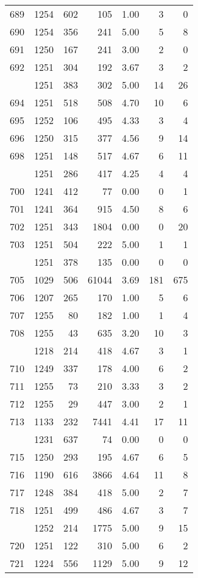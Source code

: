 \documentclass[
]{article}
\begin{document}
\begin{table}
\begin{tabular}[t]{lrrrrrr}
689 & 1254 & 602 & 105 & 1.00 & 3 & 0\\
690 & 1254 & 356 & 241 & 5.00 & 5 & 8\\
691 & 1250 & 167 & 241 & 3.00 & 2 & 0\\
692 & 1251 & 304 & 192 & 3.67 & 3 & 2\\
\addlinespace
693 & 1251 & 383 & 302 & 5.00 & 14 & 26\\
694 & 1251 & 518 & 508 & 4.70 & 10 & 6\\
695 & 1252 & 106 & 495 & 4.33 & 3 & 4\\
696 & 1250 & 315 & 377 & 4.56 & 9 & 14\\
698 & 1251 & 148 & 517 & 4.67 & 6 & 11\\
\addlinespace
699 & 1251 & 286 & 417 & 4.25 & 4 & 4\\
700 & 1241 & 412 & 77 & 0.00 & 0 & 1\\
701 & 1241 & 364 & 915 & 4.50 & 8 & 6\\
702 & 1251 & 343 & 1804 & 0.00 & 0 & 20\\
703 & 1251 & 504 & 222 & 5.00 & 1 & 1\\
\addlinespace
704 & 1251 & 378 & 135 & 0.00 & 0 & 0\\
705 & 1029 & 506 & 61044 & 3.69 & 181 & 675\\
706 & 1207 & 265 & 170 & 1.00 & 5 & 6\\
707 & 1255 & 80 & 182 & 1.00 & 1 & 4\\
708 & 1255 & 43 & 635 & 3.20 & 10 & 3\\
\addlinespace
709 & 1218 & 214 & 418 & 4.67 & 3 & 1\\
710 & 1249 & 337 & 178 & 4.00 & 6 & 2\\
711 & 1255 & 73 & 210 & 3.33 & 3 & 2\\
712 & 1255 & 29 & 447 & 3.00 & 2 & 1\\
713 & 1133 & 232 & 7441 & 4.41 & 17 & 11\\
\addlinespace
714 & 1231 & 637 & 74 & 0.00 & 0 & 0\\
715 & 1250 & 293 & 195 & 4.67 & 6 & 5\\
716 & 1190 & 616 & 3866 & 4.64 & 11 & 8\\
717 & 1248 & 384 & 418 & 5.00 & 2 & 7\\
718 & 1251 & 499 & 486 & 4.67 & 3 & 7\\
\addlinespace
719 & 1252 & 214 & 1775 & 5.00 & 9 & 15\\
720 & 1251 & 122 & 310 & 5.00 & 6 & 2\\
721 & 1224 & 556 & 1129 & 5.00 & 9 & 12\\

\end{tabular}
\end{table}
\end{document}
